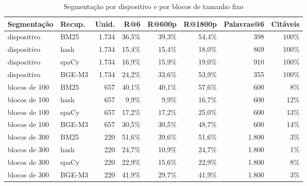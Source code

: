 \begin{table}[htbp]
\caption{Segmentação por dispositivo e por blocos de tamanho fixo}\label{tab:segmentacao}
\centering\footnotesize
\setlength{\tabcolsep}{4pt}
\begin{tabular}{llrrrrrr}
\toprule
Segmentação & Recup. & Unid. & R@6 & R@600p & R@1800p & Palavras@6 & Citáveis \\
\midrule
dispositivo & BM25 & 1.734 & 36,5\% & 39,3\% & 54,4\% & 398 & 100\% \\
dispositivo & hash & 1.734 & 15,4\% & 15,4\% & 18,0\% & 869 & 100\% \\
dispositivo & spaCy & 1.734 & 16,9\% & 15,9\% & 19,0\% & 910 & 100\% \\
dispositivo & BGE-M3 & 1.734 & 24,2\% & 33,6\% & 53,9\% & 355 & 100\% \\
blocos de 100 & BM25 & 657 & 40,1\% & 40,1\% & 57,6\% & 600 & 8\% \\
blocos de 100 & hash & 657 & 9,9\% & 9,9\% & 16,7\% & 600 & 12\% \\
blocos de 100 & spaCy & 657 & 17,2\% & 17,2\% & 25,0\% & 600 & 13\% \\
blocos de 100 & BGE-M3 & 657 & 30,5\% & 30,5\% & 48,7\% & 600 & 14\% \\
blocos de 300 & BM25 & 220 & 51,6\% & 39,6\% & 51,6\% & 1.800 & 3\% \\
blocos de 300 & hash & 220 & 24,7\% & 10,9\% & 24,7\% & 1.800 & 1\% \\
blocos de 300 & spaCy & 220 & 22,9\% & 15,6\% & 22,9\% & 1.800 & 8\% \\
blocos de 300 & BGE-M3 & 220 & 41,9\% & 29,7\% & 41,9\% & 1.800 & 3\% \\
\bottomrule
\end{tabular}
\end{table}
